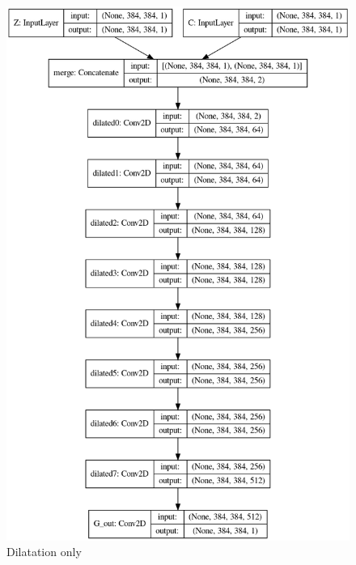 \documentclass{article}
\begin{document}
		\begin{figure}
		\centering
		\includegraphics[scale=0.4]{dilated_only.png}
		\caption{Dilatation only}
		\end{figure}
\end{document}
